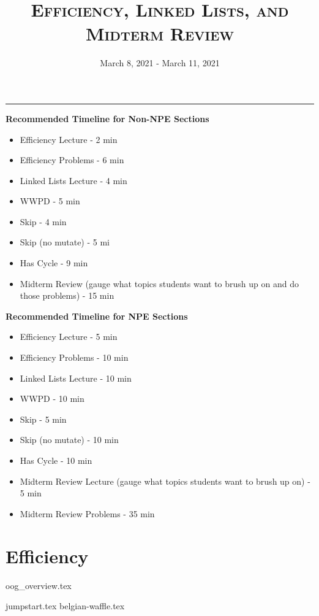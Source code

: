 \documentclass{exam}
\title{\textsc{Efficiency, Linked Lists, and Midterm Review}}
\date{March 8, 2021 - March 11, 2021}
\begin{document}
\maketitle
\rule{\textwidth}{0.15em}
\fontsize{12}{15}\selectfont

\begin{guide}
\textbf{Recommended Timeline for Non-NPE Sections}
\begin{itemize}
    \item Efficiency Lecture - 2 min
    \item Efficiency Problems - 6 min
    \item Linked Lists Lecture - 4 min
    \item WWPD - 5 min
    \item Skip - 4 min
    \item Skip (no mutate) - 5 mi
    \item Has Cycle - 9 min
    \item Midterm Review (gauge what topics students want to brush up on and do those problems) - 15 min
\end{itemize}
\vspace{.5cm}
\textbf{Recommended Timeline for NPE Sections}
\begin{itemize}
    \item Efficiency Lecture - 5 min
    \item Efficiency Problems - 10 min
    \item Linked Lists Lecture - 10 min
    \item WWPD - 10 min
    \item Skip - 5 min
    \item Skip (no mutate) - 10 min
    \item Has Cycle - 10 min
    \item Midterm Review Lecture (gauge what topics students want to brush up on) - 5 min
    \item Midterm Review Problems - 35 min
\end{itemize}
\newpage
\end{guide}

\section{Efficiency}
{oog_overview.tex}
\begin{questions}
{jumpstart.tex}
{belgian-waffle.tex}
\end{questions}
\end{document}

